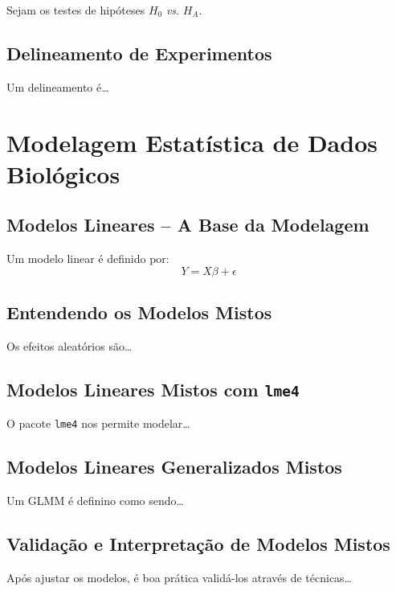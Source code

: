 \documentclass[
  12pt,
  letterpaper,
  DIV=11,
  numbers=noendperiod]{scrreprt}
\begin{document}
Sejam os testes de hipóteses \(H_0\) \emph{vs}. \(H_A\).

\chapter{Delineamento de
Experimentos}\label{delineamento-de-experimentos}

Um delineamento é\ldots{}

\part{Modelagem Estatística de Dados Biológicos}

\chapter{Modelos Lineares -- A Base da
Modelagem}\label{modelos-lineares-a-base-da-modelagem}

Um modelo linear é definido por: \[Y = X\beta + \epsilon\]

\chapter{Entendendo os Modelos
Mistos}\label{entendendo-os-modelos-mistos}

Os efeitos aleatórios são\ldots{}

\chapter{\texorpdfstring{Modelos Lineares Mistos com
\texttt{lme4}}{Modelos Lineares Mistos com }}\label{modelos-lineares-mistos-com}

O pacote \texttt{lme4} nos permite modelar\ldots{}

\chapter{Modelos Lineares Generalizados
Mistos}\label{modelos-lineares-generalizados-mistos}

Um GLMM é definino como sendo\ldots{}

\chapter{Validação e Interpretação de Modelos
Mistos}\label{validauxe7uxe3o-e-interpretauxe7uxe3o-de-modelos-mistos}

Após ajustar os modelos, é boa prática validá-los através de
técnicas\ldots{}
\end{document}
